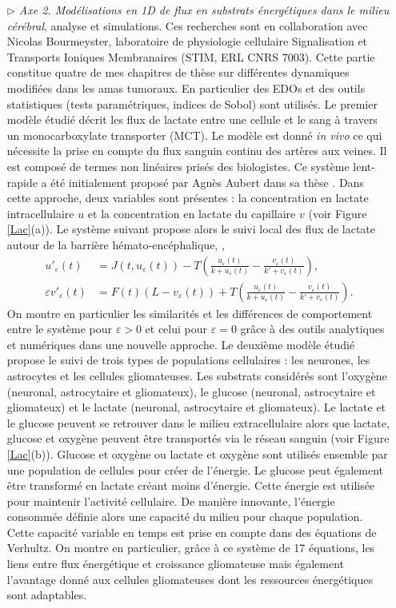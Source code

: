 \documentclass[a4paper, 12pt, twoside, openright]{article}
\begin{document}
\begin{itemize}
\begin{itemize}
\item[$\triangleright$]\textit{Axe 2. Modélisations en 1D de flux en substrats énergétiques dans le milieu cérébral}, analyse et simulations. Ces recherches sont en collaboration avec Nicolas Bourmeyster, laboratoire de physiologie cellulaire Signalisation et Transports Ioniques Membranaires (STIM, ERL CNRS 7003). Cette partie constitue quatre de mes chapitres de thèse sur différentes dynamiques modifiées dans les amas tumoraux. En particulier des EDOs et des outils statistiques (tests paramétriques, indices de Sobol) sont utilisés. Le premier modèle étudié décrit les flux de lactate entre une cellule et le sang à travers un monocarboxylate transporter (MCT). Le modèle est donné \textit{in vivo} ce qui nécessite la prise en compte du flux sanguin continu des artères aux veines. Il est composé de termes non linéaires prisés des biologistes. Ce système lent-rapide a été initialement proposé par Agnès Aubert dans sa thèse \cite{Taubert, aubert2005}. Dans cette approche, deux variables sont présentes : la concentration en lactate intracellulaire $u$ et la concentration en lactate du capillaire $v$ (voir Figure \ref{Lac}(a)). \hs Le système suivant propose alors le suivi local des flux de lactate autour de la barrière hémato-encéphalique, \fat ,
\vspace{-0.25cm}
\begin{align*}
{u'}_{\varepsilon}(t) &= J(t,u_{\varepsilon}(t))-T(\frac{u_{\varepsilon}(t)}{k+u_{\varepsilon}(t)}-\frac{v_{\varepsilon}(t)}{k'+v_{\varepsilon}(t)}), \\ 
 \varepsilon {v'}_{\varepsilon}(t) &= F(t)(L-v_{\varepsilon}(t))+T(\frac{u_{\varepsilon}(t)}{k+u_{\varepsilon}(t)}-\frac{v_{\varepsilon}(t)}{k'+v_{\varepsilon}(t)}).
\end{align*}
\vspace{-0.25cm}
On montre en particulier les similarités et les différences de comportement entre le système pour $\varepsilon>0$ et celui pour $\varepsilon=0$ grâce à des outils analytiques et numériques dans une nouvelle approche. Le deuxième modèle étudié propose le suivi de trois types de populations cellulaires : les neurones, les astrocytes et les cellules gliomateuses. Les substrats considérés sont l'oxygène (neuronal, astrocytaire et gliomateux), le glucose (neuronal, astrocytaire et gliomateux) et le lactate (neuronal, astrocytaire et gliomateux). Le lactate et le glucose peuvent se retrouver dans le milieu extracellulaire  alors que lactate, glucose et oxygène peuvent être transportés via le réseau sanguin (voir Figure \ref{Lac}(b)). Glucose et oxygène ou lactate et oxygène sont utilisés ensemble par une population de cellules pour créer de l'énergie. Le glucose peut également être transformé en lactate créant moins d'énergie. Cette énergie est utilisée pour maintenir l'activité cellulaire. De manière innovante, l'énergie consommée définie alors une capacité du milieu pour chaque population. Cette capacité variable en temps est prise en compte dans des équations de Verhultz. On montre en particulier, grâce à ce système de 17 équations, les liens entre flux énergétique et croissance gliomateuse mais également l'avantage donné aux cellules gliomateuses dont les ressources énergétiques sont adaptables.

\end{itemize}
\end{itemize}
\end{document}
